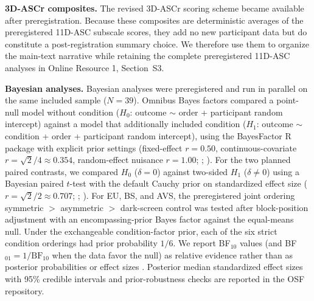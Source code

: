 \documentclass[pdflatex,sn-basic,lineno]{sn-jnl}
\begin{document}
\medskip\noindent\textbf{3D-ASCr composites.} The revised 3D-ASCr scoring scheme \citep{Stocker2025} became available after preregistration. Because these composites are deterministic averages of the preregistered 11D-ASC subscale scores, they add no new participant data but do constitute a post-registration summary choice. We therefore use them to organize the main-text narrative while retaining the complete preregistered 11D-ASC analyses in Online Resource 1, Section~S3.

\medskip\noindent\textbf{Bayesian analyses.} Bayesian analyses were preregistered and run in parallel on the same included sample ($N = 39$). Omnibus Bayes factors compared a point-null model without condition ($H_0$: outcome $\sim$ order + participant random intercept) against a model that additionally included condition ($H_1$: outcome $\sim$ condition + order + participant random intercept), using the BayesFactor R package with explicit prior settings (fixed-effect $r = 0.50$, continuous-covariate $r = \sqrt{2}/4 \approx 0.354$, random-effect nuisance $r = 1.00$; \citealt{BayesFactor}; \citealp{vanDoorn2021JASPBayesian,kruschke2021barg}). For the two planned paired contrasts, we compared $H_0$ ($\delta = 0$) against two-sided $H_1$ ($\delta \neq 0$) using a Bayesian paired $t$-test with the default Cauchy prior on standardized effect size ($r = \sqrt{2}/2 \approx 0.707$; \citealt{BayesFactor}; \citealp{vanDoorn2021JASPBayesian}). For EU, BS, and AVS, the preregistered joint ordering symmetric $>$ asymmetric $>$ dark-screen control was tested after block-position adjustment with an encompassing-prior Bayes factor against the equal-means null. Under the exchangeable condition-factor prior, each of the six strict condition orderings had prior probability $1/6$. We report BF$_{10}$ values (and BF$_{01} = 1/\mathrm{BF}_{10}$ when the data favor the null) as relative evidence rather than as posterior probabilities or effect sizes \citep{vanDoorn2021JASPBayesian,kruschke2021barg}. Posterior median standardized effect sizes with 95\% credible intervals and prior-robustness checks are reported in the OSF repository.
\end{document}
